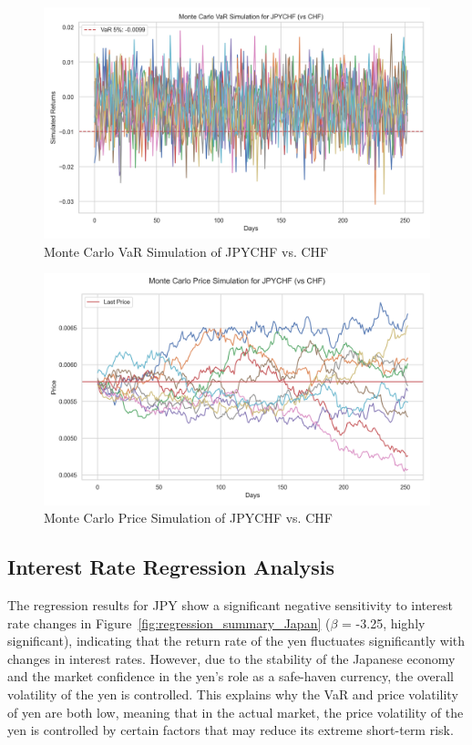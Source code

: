 \documentclass{article}
\begin{document}
\begin{figure}[h]
    \centering
    \includegraphics[width=0.75\linewidth]{reports/figures/monte_carlo_var_simulation_JPYCHF_vs_CHF.png}
    \caption{Monte Carlo VaR Simulation of JPYCHF vs. CHF}   \label{fig:monte_carlo_var_simulation_JPYCHF_vs_CHF}
\end{figure}

\begin{figure}[h]
    \centering
    \includegraphics[width=0.75\linewidth]{reports/figures/monte_carlo_price_simulation_JPYCHF_vs_CHF.png}
    \caption{Monte Carlo Price Simulation of JPYCHF vs. CHF}  \label{fig:monte_carlo_price_simulation_JPYCHF_vs_CHF}
\end{figure}

\subsection{Interest Rate Regression Analysis}
The regression results for JPY show a significant negative sensitivity to interest rate changes in Figure~\ref{fig:regression_summary_Japan} ($\beta$ = -3.25, highly significant), indicating that the return rate of the yen fluctuates significantly with changes in interest rates. However, due to the stability of the Japanese economy and the market confidence in the yen's role as a safe-haven currency, the overall volatility of the yen is controlled. This explains why the VaR and price volatility of yen are both low, meaning that in the actual market, the price volatility of the yen is controlled by certain factors that may reduce its extreme short-term risk.
\end{document}
